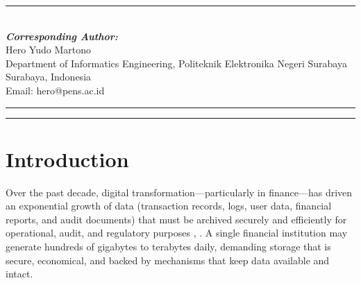 \documentclass{iaesarticle}
\begin{document}
\parbox[t][][s]{0.65\textwidth}{%
\begin{abstract}
\vspace{.3em}
Ransomware threatens the availability and integrity of data in cloud storage, and conventional backups remained vulnerable when the repository was directly reachable from the primary system, while single-algorithm compression was inefficient for heterogeneous file types. This study proposed a cloud backup system that integrated a logical air-gapped mechanism with adaptive multi-algorithm lossless compression to improve resilience and storage efficiency. The system used SHA-256 hash verification, metadata analysis, and file-structure inspection to distinguish legitimate backup encryption from ransomware-induced modification. Evaluation was performed in a controlled manner using a simulated attack model, without executing real malware, on a limited synthetic dataset of 43 files of varying types and sizes, under both normal and attacked conditions, and replicated on AWS EC2 (Windows and Linux). For low-entropy text files, compression reduced storage by up to 89.5\% (logs) and 81.1\% (CSV), whereas already-compressed files (JPG, XLSX) approached 0\%, consistent with information theory. The adaptive strategy completed the whole dataset about $21\times$ faster than static Gzip while still saving 43.3\% of storage. The system recovered all 43 affected files without error and, under the controlled conditions, achieved 0\% false positive rate (FPR) and 0\% false negative rate (FNR). Overall, the proposed approach strengthened the security, resilience, and storage efficiency of cloud backup against ransomware.
\end{abstract}
}
\parbox[l]{\textwidth}{%
\rule{0.275\textwidth}{0.5pt} \hspace{0.5cm} \hrulefill
\\
\emph{\textbf{Corresponding Author:}}
\vspace{.5em}\\
Hero Yudo Martono\\
Department of Informatics Engineering, Politeknik Elektronika Negeri Surabaya\\
Surabaya, Indonesia\\
Email: hero@pens.ac.id
}
\vspace{.5em}
\hrule
\vspace{.1em}
\hrule

\section{Introduction}
\label{sec:introduction}
Over the past decade, digital transformation---particularly in finance---has driven an exponential growth of data (transaction records, logs, user data, financial reports, and audit documents) that must be archived securely and efficiently for operational, audit, and regulatory purposes \cite{1}, \cite{2}. A single financial institution may generate hundreds of gigabytes to terabytes daily, demanding storage that is secure, economical, and backed by mechanisms that keep data available and intact.
\end{document}
